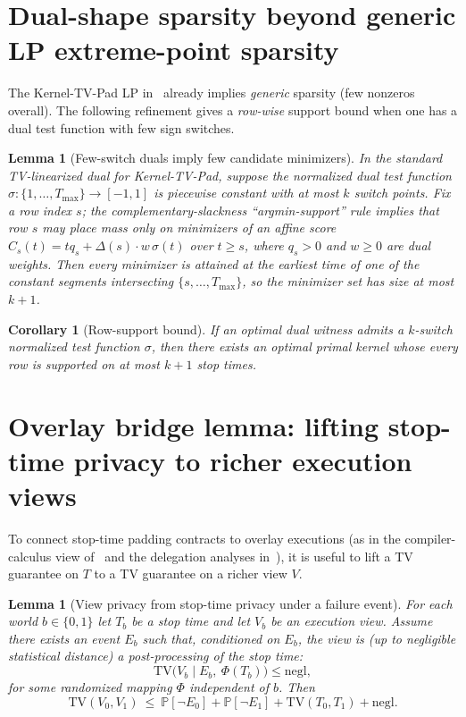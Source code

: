 \documentclass[11pt]{article}
\newtheorem{lemma}[theorem]{Lemma}
\newtheorem{corollary}[theorem]{Corollary}
\theoremstyle{remark}
\newcommand{\TV}{\mathrm{TV}}
\newcommand{\Prb}{\mathbb{P}}
\begin{document}
\section{Dual-shape sparsity beyond generic LP extreme-point sparsity}
The Kernel-TV-Pad LP in~\cite{sched} already implies \emph{generic} sparsity (few nonzeros overall).
The following refinement gives a \emph{row-wise} support bound when one has a dual test function with few sign switches.

\begin{lemma}[Few-switch duals imply few candidate minimizers]\label{lem:fews}
In the standard TV-linearized dual for Kernel-TV-Pad, suppose the normalized dual test function
$\sigma:\{1,\dots,T_{\max}\}\to[-1,1]$ is piecewise constant with at most $k$ switch points.
Fix a row index $s$; the complementary-slackness ``argmin-support'' rule implies that row $s$ may place mass only on minimizers of an affine score
$C_s(t)=t q_s + \Delta(s)\cdot w\,\sigma(t)$ over $t\ge s$, where $q_s>0$ and $w\ge 0$ are dual weights.
Then every minimizer is attained at the earliest time of one of the constant segments intersecting $\{s,\dots,T_{\max}\}$,
so the minimizer set has size at most $k+1$.
\end{lemma}

\begin{corollary}[Row-support bound]\label{cor:rowsupp}
If an optimal dual witness admits a $k$-switch normalized test function $\sigma$, then there exists an optimal primal kernel whose
every row is supported on at most $k+1$ stop times.
\end{corollary}

\section{Overlay bridge lemma: lifting stop-time privacy to richer execution views}
To connect stop-time padding contracts to overlay executions (as in the compiler-calculus view of~\cite{sched} and the delegation analyses in~\cite{spectral}),
it is useful to lift a TV guarantee on $T$ to a TV guarantee on a richer view $V$.

\begin{lemma}[View privacy from stop-time privacy under a failure event]\label{lem:bridge}
For each world $b\in\{0,1\}$ let $T_b$ be a stop time and let $V_b$ be an execution view.
Assume there exists an event $E_b$ such that, conditioned on $E_b$, the view is (up to negligible statistical distance) a post-processing of the stop time:
\[
\TV\bigl( V_b\mid E_b,\ \Phi(T_b)\bigr)\le \mathrm{negl},
\]
for some randomized mapping $\Phi$ independent of $b$. Then
\[
\TV(V_0,V_1)\ \le\ \Prb[\neg E_0]+\Prb[\neg E_1]+\TV(T_0,T_1)+\mathrm{negl}.
\]
\end{lemma}
\end{document}
